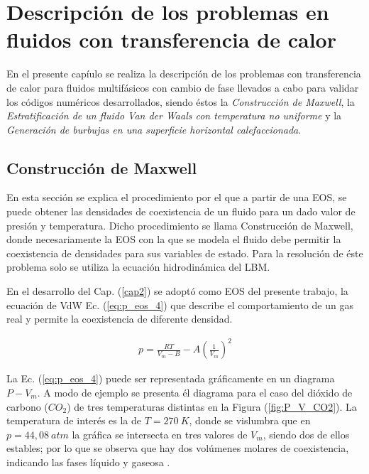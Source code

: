 \chapter{Descripción de los problemas en fluidos con transferencia de calor }
\graphicspath{{figs/cap4/}}
\label{cap4}

En el presente capíulo se realiza la descripción de los problemas con transferencia de calor para fluidos multifásicos con cambio de fase llevados a cabo para validar los códigos numéricos desarrollados, siendo éstos la \textit{Construcción de Maxwell}, la \textit{Estratificación de un fluido Van der Waals con temperatura no uniforme} y la \textit{Generación de burbujas en una superficie horizontal calefaccionada}.

\section{Construcción de Maxwell}

En esta sección se explica el procedimiento por el que a partir de una EOS, se puede obtener las densidades de coexistencia de un fluido para un dado valor de presión y temperatura. Dicho procedimiento se llama Construcción de Maxwell, donde necesariamente la EOS con la que se modela el fluido debe permitir la coexistencia de densidades para sus variables de estado. Para la resolución de éste problema solo se utiliza la ecuación hidrodinámica del LBM.

En el desarrollo del Cap. (\ref{cap2}) se adoptó como EOS del presente trabajo, la ecuación de VdW Ec. (\ref{eq:p_eos_4}) que describe el comportamiento de un gas real y permite la coexistencia de diferente densidad.

\begin{align}
	p = \frac{R T}{V_m - B} - A {\left(\frac{1}{V_m}\right)}^2
	\label{eq:p_eos_4}
\end{align}

La Ec. (\ref{eq:p_eos_4}) puede ser representada gráficamente en un diagrama $P - V_m$. A modo de ejemplo se presenta él diagrama para el caso del dióxido de carbono ($CO_2$) de tres temperaturas distintas en la Figura (\ref{fig:P_V_CO2}).  La temperatura de interés es la de $T = 270 \> K$, donde se vislumbra que en $p = 44,08 \> atm$ la gráfica se intersecta en tres valores de $V_m$, siendo dos de ellos estables; por lo que se observa que hay dos volúmenes molares de coexistencia, indicando las fases líquido y gaseosa \cite{huang2015multiphase}. 


